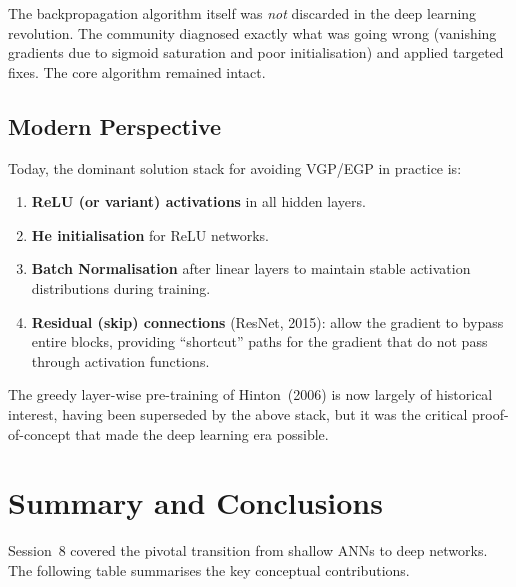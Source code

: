 \documentclass[12pt,a4paper]{article}
\begin{document}
\begin{keyinsight}
The backpropagation algorithm itself was \emph{not} discarded in the
deep learning revolution.  The community diagnosed exactly what was
going wrong (vanishing gradients due to sigmoid saturation and poor
initialisation) and applied targeted fixes.  The core algorithm
remained intact.
\end{keyinsight}

\subsection{Modern Perspective}
\label{subsec:modern_perspective}

Today, the dominant solution stack for avoiding VGP/EGP in practice is:

\begin{enumerate}
  \item \textbf{ReLU (or variant) activations} in all hidden layers.
  \item \textbf{He initialisation} for ReLU networks.
  \item \textbf{Batch Normalisation} after linear layers to maintain
        stable activation distributions during training.
  \item \textbf{Residual (skip) connections} (ResNet, 2015): allow
        the gradient to bypass entire blocks, providing ``shortcut''
        paths for the gradient that do not pass through activation
        functions.
\end{enumerate}

The greedy layer-wise pre-training of Hinton~(2006) is now largely of
historical interest, having been superseded by the above stack, but it
was the critical proof-of-concept that made the deep learning era
possible.

\section{Summary and Conclusions}
\label{sec:summary}

Session~8 covered the pivotal transition from shallow ANNs to deep
networks.  The following table summarises the key conceptual
contributions.
\end{document}
